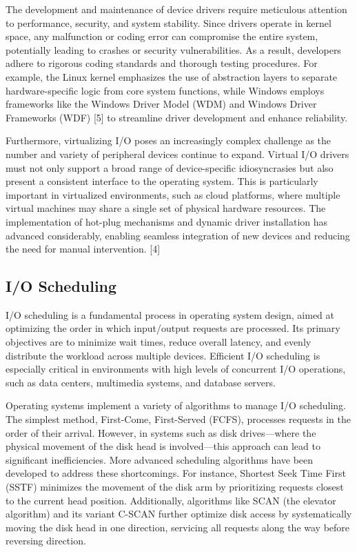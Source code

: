 \documentclass[a4paper]{article}
\begin{document}
The development and maintenance of device drivers require meticulous attention to performance, security, and system stability. Since drivers operate in kernel space, any malfunction or coding error can compromise the entire system, potentially leading to crashes or security vulnerabilities. As a result, developers adhere to rigorous coding standards and thorough testing procedures. For example, the Linux kernel emphasizes the use of abstraction layers to separate hardware-specific logic from core system functions, while Windows employs frameworks like the Windows Driver Model (WDM) and Windows Driver Frameworks (WDF) [5] to streamline driver development and enhance reliability.

Furthermore, virtualizing I/O poses an increasingly complex challenge as the number and variety of peripheral devices continue to expand. Virtual I/O drivers must not only support a broad range of device-specific idiosyncrasies but also present a consistent interface to the operating system. This is particularly important in virtualized environments, such as cloud platforms, where multiple virtual machines may share a single set of physical hardware resources. The implementation of hot-plug mechanisms and dynamic driver installation has advanced considerably, enabling seamless integration of new devices and reducing the need for manual intervention. [4]

\subsection{I/O Scheduling}

I/O scheduling is a fundamental process in operating system design, aimed at optimizing the order in which input/output requests are processed. Its primary objectives are to minimize wait times, reduce overall latency, and evenly distribute the workload across multiple devices. Efficient I/O scheduling is especially critical in environments with high levels of concurrent I/O operations, such as data centers, multimedia systems, and database servers.

Operating systems implement a variety of algorithms to manage I/O scheduling. The simplest method, First-Come, First-Served (FCFS), processes requests in the order of their arrival. However, in systems such as disk drives—where the physical movement of the disk head is involved—this approach can lead to significant inefficiencies. More advanced scheduling algorithms have been developed to address these shortcomings. For instance, Shortest Seek Time First (SSTF) minimizes the movement of the disk arm by prioritizing requests closest to the current head position. Additionally, algorithms like SCAN (the elevator algorithm) and its variant C-SCAN further optimize disk access by systematically moving the disk head in one direction, servicing all requests along the way before reversing direction.
\end{document}
